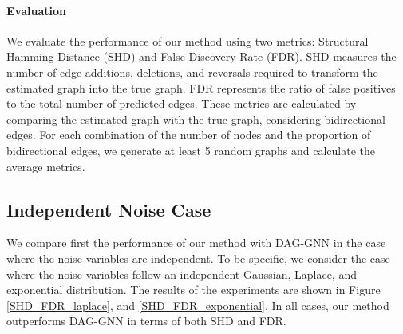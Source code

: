 \documentclass[10pt]{article}
\begin{document}
\paragraph*{Evaluation} We evaluate the performance of our method using two metrics: Structural Hamming Distance (SHD) and False Discovery Rate (FDR). SHD measures the number of edge additions, deletions, and reversals required to transform the estimated graph into the true graph. FDR represents the ratio of false positives to the total number of predicted edges. These metrics are calculated by comparing the estimated graph with the true graph, considering bidirectional edges. For each combination of the number of nodes and the proportion of bidirectional edges, we generate at least 5 random graphs and calculate the average metrics.

\subsection{Independent Noise Case}

We compare first the performance of our method with DAG-GNN in the case where the noise variables are independent. To be specific, we consider the case where the noise variables follow an independent Gaussian, Laplace, and exponential distribution. The results of the experiments are shown in Figure \ref*{SHD_FDR_laplace}, and \ref*{SHD_FDR_exponential}. In all cases, our method outperforms DAG-GNN in terms of both SHD and FDR.\\
\end{document}
